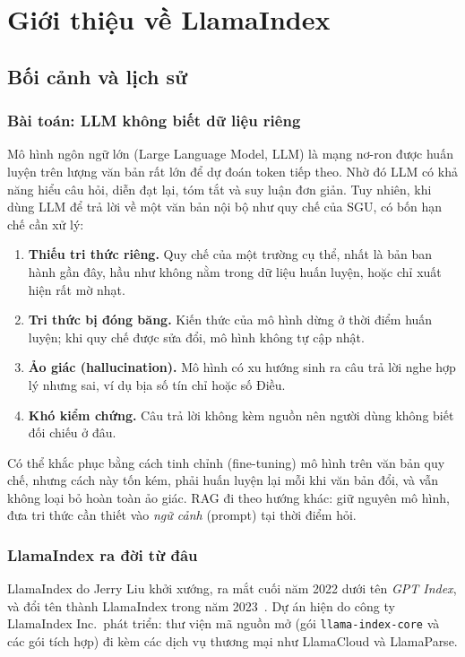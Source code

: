 \chapter{Giới thiệu về LlamaIndex}
\label{ch:llamaindex}

\section{Bối cảnh và lịch sử}

\subsection{Bài toán: LLM không biết dữ liệu riêng}

Mô hình ngôn ngữ lớn (Large Language Model, LLM) là mạng nơ-ron được huấn luyện trên lượng văn bản rất lớn để dự đoán token tiếp theo. Nhờ đó LLM có khả năng hiểu câu hỏi, diễn đạt lại, tóm tắt và suy luận đơn giản. Tuy nhiên, khi dùng LLM để trả lời về một văn bản nội bộ như quy chế của SGU, có bốn hạn chế cần xử lý:

\begin{enumerate}
  \item \textbf{Thiếu tri thức riêng.} Quy chế của một trường cụ thể, nhất là bản ban hành gần đây, hầu như không nằm trong dữ liệu huấn luyện, hoặc chỉ xuất hiện rất mờ nhạt.
  \item \textbf{Tri thức bị đóng băng.} Kiến thức của mô hình dừng ở thời điểm huấn luyện; khi quy chế được sửa đổi, mô hình không tự cập nhật.
  \item \textbf{Ảo giác (hallucination).} Mô hình có xu hướng sinh ra câu trả lời nghe hợp lý nhưng sai, ví dụ bịa số tín chỉ hoặc số Điều.
  \item \textbf{Khó kiểm chứng.} Câu trả lời không kèm nguồn nên người dùng không biết đối chiếu ở đâu.
\end{enumerate}

Có thể khắc phục bằng cách tinh chỉnh (fine-tuning) mô hình trên văn bản quy chế, nhưng cách này tốn kém, phải huấn luyện lại mỗi khi văn bản đổi, và vẫn không loại bỏ hoàn toàn ảo giác. RAG đi theo hướng khác: giữ nguyên mô hình, đưa tri thức cần thiết vào \emph{ngữ cảnh} (prompt) tại thời điểm hỏi.

\subsection{LlamaIndex ra đời từ đâu}

LlamaIndex do Jerry Liu khởi xướng, ra mắt cuối năm 2022 dưới tên \emph{GPT Index}, và đổi tên thành
LlamaIndex trong năm 2023~\cite{llamaindexrepo}. Dự án hiện do công ty LlamaIndex Inc.\ phát triển:
thư viện mã nguồn mở (gói \texttt{llama-index-core} và các gói tích hợp) đi kèm các dịch vụ thương mại
như LlamaCloud và LlamaParse.

